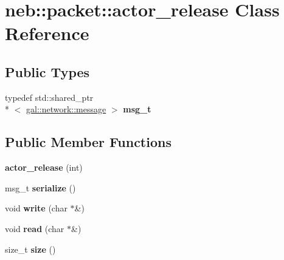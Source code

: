 \hypertarget{classneb_1_1packet_1_1actor__release}{\section{neb\-:\-:packet\-:\-:actor\-\_\-release Class Reference}
\label{classneb_1_1packet_1_1actor__release}
}
\subsection*{Public Types}
\begin{DoxyCompactItemize}
\item 
\hypertarget{classneb_1_1packet_1_1actor__release_a00cd43364472a514dd494ff623b38435}{typedef std\-::shared\-\_\-ptr\\*
$<$ \hyperlink{classgal_1_1network_1_1message}{gal\-::network\-::message} $>$ {\bfseries msg\-\_\-t}}\label{classneb_1_1packet_1_1actor__release_a00cd43364472a514dd494ff623b38435}

\end{DoxyCompactItemize}
\subsection*{Public Member Functions}
\begin{DoxyCompactItemize}
\item 
\hypertarget{classneb_1_1packet_1_1actor__release_a427941df801ea77f69c914b2cc15519e}{{\bfseries actor\-\_\-release} (int)}\label{classneb_1_1packet_1_1actor__release_a427941df801ea77f69c914b2cc15519e}

\item 
\hypertarget{classneb_1_1packet_1_1actor__release_ae798345bb4f2a39ebaba785036d1da89}{msg\-\_\-t {\bfseries serialize} ()}\label{classneb_1_1packet_1_1actor__release_ae798345bb4f2a39ebaba785036d1da89}

\item 
\hypertarget{classneb_1_1packet_1_1actor__release_a4ac4e4dd9da7391390d84e3549a590ff}{void {\bfseries write} (char $\ast$\&)}\label{classneb_1_1packet_1_1actor__release_a4ac4e4dd9da7391390d84e3549a590ff}

\item 
\hypertarget{classneb_1_1packet_1_1actor__release_a510a1b4586257e3bd25766e2f29f4239}{void {\bfseries read} (char $\ast$\&)}\label{classneb_1_1packet_1_1actor__release_a510a1b4586257e3bd25766e2f29f4239}

\item 
\hypertarget{classneb_1_1packet_1_1actor__release_a8068e8fa32dc9e51670dcea7e20ef8d6}{size\-\_\-t {\bfseries size} ()}\label{classneb_1_1packet_1_1actor__release_a8068e8fa32dc9e51670dcea7e20ef8d6}

\end{DoxyCompactItemize}
